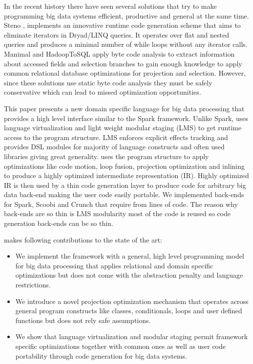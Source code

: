 In the recent history there have seen several solutions that try to make programming big data systems efficient, productive and general at the same time. Steno \cite{murray_steno:_2011}, implements an innovative runtime code generation scheme that aims to eliminate iterators in Dryad/LINQ queries. It operates over flat and nested queries and produces a minimal number of while loops without any iterator calls. Manimal \cite{jahani_automatic_2011} and HadoopToSQL \cite{iu_hadooptosql:_2010} apply byte code analysis to extract information about accessed fields and selection branches to gain enough knowledge to apply common relational database optimizations for projection and selection. However, since these solutions use static byte code analysis they must be safely conservative which can lead to missed optimization opportunities.         

This paper presents a new domain specific language \tool for big data processing that provides a high level interface similar to the Spark framework. Unlike Spark, \tool uses language virtualization \cite{moors_scala-virtualized_2012} and light weight modular staging (LMS)\cite{rompf_lightweight_2010} to get runtime access to the program structure. LMS enforces explicit effects tracking and provides DSL modules for majority of language constructs and often used libraries giving \tool great generality. \tool uses the program structure to apply optimizations like code motion, loop fusion, projection optimization and inlining to produce a highly optimized intermediate representation (IR). Highly optimized IR is then used by a thin code generation layer to produce code for arbitrary big data back-end making the user code easily portable. We implemented back-ends for Spark, Scoobi \cite{nicta_scoobi_2012} and Crunch \cite{_crunch_2012} that require from  lines of code. The reason why back-ends are so thin is LMS modularity most of the code is reused so code generation back-ends can be so thin.
 

\tool makes following contributions to the state of the art:    
\begin{itemize}

  \item We implement the \tool framework with a general, high level programming model for big data processing that applies relational and domain specific optimizations but does not come with the abstraction penalty and language restrictions.

  \item We introduce a novel projection optimization mechanism that operates across general program constructs like classes, conditionals, loops and user defined functions but does not rely safe assumptions.

  \item We show that language virtualization and modular staging permit framework specific optimizations together with common ones as well as user code portability through code generation for big data systems.

\end{itemize} 

